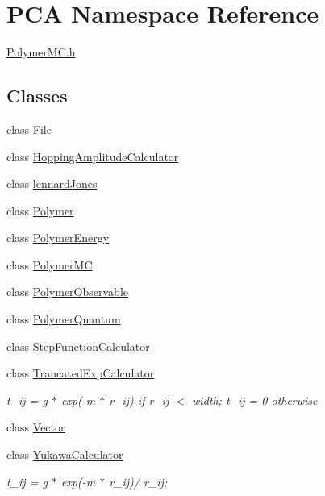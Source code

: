 \hypertarget{namespace_p_c_a}{}\section{P\+CA Namespace Reference}
\label{namespace_p_c_a}


\hyperlink{_polymer_m_c_8h}{Polymer\+M\+C.\+h}.  


\subsection*{Classes}
\begin{DoxyCompactItemize}
\item 
class \hyperlink{class_p_c_a_1_1_file}{File}
\item 
class \hyperlink{class_p_c_a_1_1_hopping_amplitude_calculator}{Hopping\+Amplitude\+Calculator}
\item 
class \hyperlink{class_p_c_a_1_1lennard_jones}{lennard\+Jones}
\item 
class \hyperlink{class_p_c_a_1_1_polymer}{Polymer}
\item 
class \hyperlink{class_p_c_a_1_1_polymer_energy}{Polymer\+Energy}
\item 
class \hyperlink{class_p_c_a_1_1_polymer_m_c}{Polymer\+MC}
\item 
class \hyperlink{class_p_c_a_1_1_polymer_observable}{Polymer\+Observable}
\item 
class \hyperlink{class_p_c_a_1_1_polymer_quantum}{Polymer\+Quantum}
\item 
class \hyperlink{class_p_c_a_1_1_step_function_calculator}{Step\+Function\+Calculator}
\item 
class \hyperlink{class_p_c_a_1_1_trancated_exp_calculator}{Trancated\+Exp\+Calculator}
\begin{DoxyCompactList}\small\item\em t\+\_\+ij = g $\ast$ exp(-\/m $\ast$ r\+\_\+ij) if r\+\_\+ij $<$ width; t\+\_\+ij = 0 otherwise \end{DoxyCompactList}\item 
class \hyperlink{class_p_c_a_1_1_vector}{Vector}
\item 
class \hyperlink{class_p_c_a_1_1_yukawa_calculator}{Yukawa\+Calculator}
\begin{DoxyCompactList}\small\item\em t\+\_\+ij = g $\ast$ exp(-\/m $\ast$ r\+\_\+ij)/ r\+\_\+ij; \end{DoxyCompactList}\end{DoxyCompactItemize}
